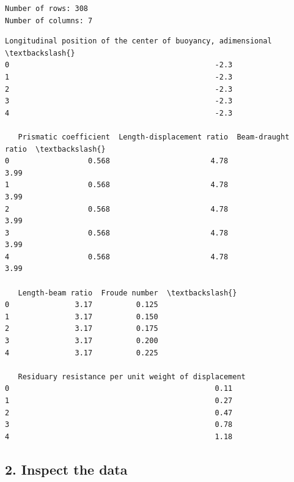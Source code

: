 \documentclass[1pt]{article}
\begin{document}
    \begin{Verbatim}[commandchars=\\\{\}]
Number of rows: 308
Number of columns: 7
    \end{Verbatim}


    \begin{Verbatim}[commandchars=\\\{\}]
   Longitudinal position of the center of buoyancy, adimensional  \textbackslash{}
0                                               -2.3               
1                                               -2.3               
2                                               -2.3               
3                                               -2.3               
4                                               -2.3               

   Prismatic coefficient  Length-displacement ratio  Beam-draught ratio  \textbackslash{}
0                  0.568                       4.78                3.99   
1                  0.568                       4.78                3.99   
2                  0.568                       4.78                3.99   
3                  0.568                       4.78                3.99   
4                  0.568                       4.78                3.99   

   Length-beam ratio  Froude number  \textbackslash{}
0               3.17          0.125   
1               3.17          0.150   
2               3.17          0.175   
3               3.17          0.200   
4               3.17          0.225   

   Residuary resistance per unit weight of displacement  
0                                               0.11     
1                                               0.27     
2                                               0.47     
3                                               0.78     
4                                               1.18
    \end{Verbatim}


    \hypertarget{inspect-the-data}{%
        \subsection{2. Inspect the data}\label{inspect-the-data}}
\end{document}

